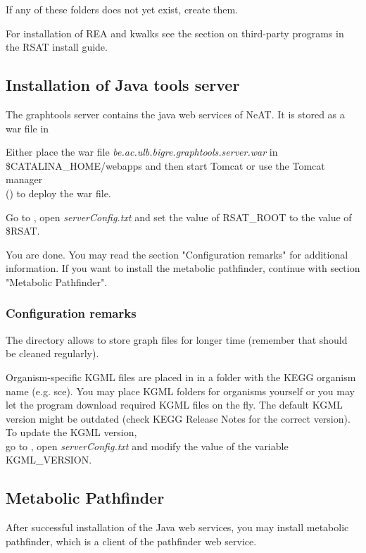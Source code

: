 \documentclass{book}
\begin{document}
If any of these folders does not yet exist, create them.

For installation of REA and kwalks see the section on third-party programs in
the RSAT install guide.

\subsection{Installation of Java tools server}
The graphtools server contains the java web services of NeAT. It is stored as a war file
in 

Either place the war file \textit{be.ac.ulb.bigre.graphtools.server.war} in
\$CATALINA\_HOME/webapps and then start Tomcat or use the Tomcat manager\\
 ()
 to deploy the war file.

Go to , open
\textit{serverConfig.txt} and set the value of RSAT\_ROOT to the value of \$RSAT.

You are done. You may read the section "Configuration remarks" for additional information.
If you want to install the metabolic pathfinder, continue with section "Metabolic Pathfinder".

\subsubsection{Configuration remarks}

The directory 
allows to store graph files for longer time
(remember that  should be cleaned regularly).

Organism-specific KGML files are
placed in  in a folder with the KEGG organism name (e.g. sce).
You may place KGML folders for organisms yourself or you may let the program download
required KGML files on the fly. The default KGML version might be outdated
(check KEGG Release Notes for the correct version). To update the KGML version,\\
go to , open
\textit{serverConfig.txt} and modify the value of the variable KGML\_VERSION.

\subsection{Metabolic Pathfinder}
After successful installation of the Java web services, you may install metabolic pathfinder,
which is a client of the pathfinder web service.
\end{document}
